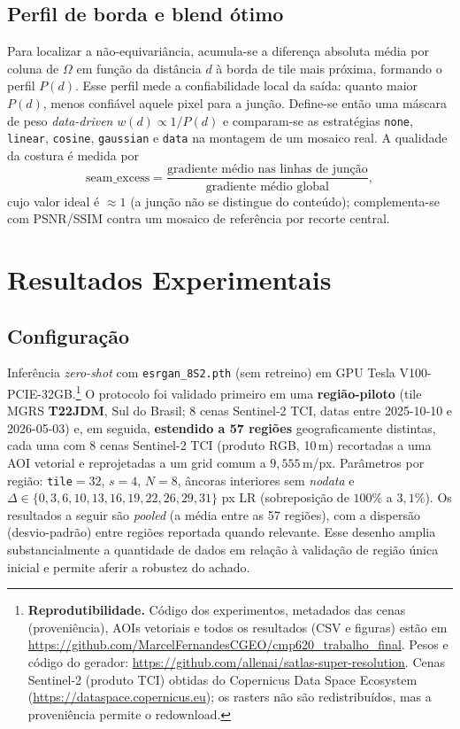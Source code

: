 \documentclass[conference]{IEEEtran}
\begin{document}
\subsection{Perfil de borda e blend ótimo}
Para localizar a não-equivariância, acumula-se a diferença absoluta média por coluna de
$\Omega$ em função da distância $d$ à borda de tile mais próxima, formando o perfil
$P(d)$. Esse perfil mede a confiabilidade local da saída: quanto maior $P(d)$, menos
confiável aquele pixel para a junção. Define-se então uma máscara de peso
\textit{data-driven} $w(d) \propto 1/P(d)$ e comparam-se as estratégias
\texttt{none}, \texttt{linear}, \texttt{cosine}, \texttt{gaussian} e \texttt{data} na
montagem de um mosaico real. A qualidade da costura é medida por
\begin{equation}
\mathrm{seam\_excess} = \frac{\text{gradiente médio nas linhas de junção}}{\text{gradiente médio global}},
\label{eq:seam}
\end{equation}
cujo valor ideal é $\approx 1$ (a junção não se distingue do conteúdo); complementa-se
com PSNR/SSIM contra um mosaico de referência por recorte central.

\section{Resultados Experimentais}
\label{sec:resultados}
\subsection{Configuração}
Inferência \emph{zero-shot} com \texttt{esrgan\_8S2.pth} (sem retreino) em GPU
Tesla V100-PCIE-32GB.\footnote{\textbf{Reprodutibilidade.} Código dos experimentos,
metadados das cenas (proveniência), AOIs vetoriais e todos os resultados (CSV e figuras)
estão em \url{https://github.com/MarcelFernandesCGEO/cmp620_trabalho_final}. Pesos e código
do gerador: \url{https://github.com/allenai/satlas-super-resolution}. Cenas Sentinel-2
(produto TCI) obtidas do Copernicus Data Space Ecosystem
(\url{https://dataspace.copernicus.eu}); os rasters não são redistribuídos, mas a
proveniência permite o redownload.} O protocolo foi validado primeiro em uma \textbf{região-piloto}
(tile MGRS \textbf{T22JDM}, Sul do Brasil; $8$ cenas Sentinel-2 TCI, datas entre
2025-10-10 e 2026-05-03) e, em seguida, \textbf{estendido a 57 regiões} geograficamente
distintas, cada uma com $8$ cenas Sentinel-2 TCI (produto RGB, 10\,m) recortadas a uma
AOI vetorial e reprojetadas a um grid comum a $9{,}555$\,m/px. Parâmetros por região:
\texttt{tile}$=32$, $s=4$, $N=8$, âncoras interiores sem \textit{nodata} e
$\Delta \in \{0,3,6,10,13,16,19,22,26,29,31\}$ px LR (sobreposição de $100\%$ a
$3{,}1\%$). Os resultados a seguir são \emph{pooled} (a média entre as 57 regiões),
com a dispersão (desvio-padrão) entre regiões reportada quando relevante. Esse desenho
amplia substancialmente a quantidade de dados em relação à validação de região única
inicial e permite aferir a robustez do achado.
\end{document}
